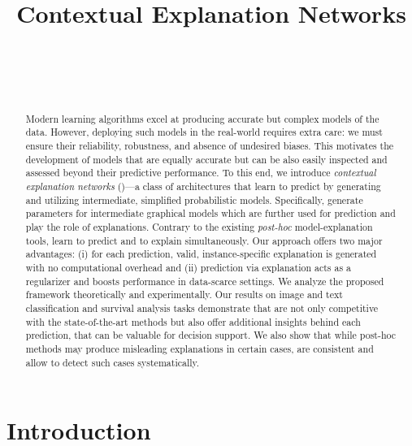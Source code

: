 \documentclass[twoside,11pt]{article}
\begin{document}
\title{Contextual Explanation Networks}

\author{  \\
  \AND
    \\
  \AND
    \\
  }


\maketitle


\begin{abstract}Modern learning algorithms excel at producing accurate but complex models of the data.
However, deploying such models in the real-world requires extra care: we must ensure their reliability, robustness, and absence of undesired biases.
This motivates the development of models that are equally accurate but can be also easily inspected and assessed beyond their predictive performance.
To this end, we introduce \emph{contextual explanation networks} ({\CENs})---a class of architectures that learn to predict by generating and utilizing intermediate, simplified probabilistic models.
Specifically, {\CENs} generate parameters for intermediate graphical models which are further used for prediction and play the role of explanations.
Contrary to the existing \emph{post-hoc} model-explanation tools, {\CENs} learn to predict and to explain simultaneously.
Our approach offers two major advantages: (i) for each prediction, valid, instance-specific explanation is generated with no computational overhead and (ii) prediction via explanation acts as a regularizer and boosts performance in data-scarce settings.
We analyze the proposed framework theoretically and experimentally.
Our results on image and text classification and survival analysis tasks demonstrate that {\CENs} are not only competitive with the state-of-the-art methods but also offer additional insights behind each prediction, that can be valuable for decision support.
We also show that while post-hoc methods may produce misleading explanations in certain cases, {\CENs} are consistent and allow to detect such cases systematically.
\end{abstract}
 
\section{Introduction}\label{sec:introduction}
\end{document}
